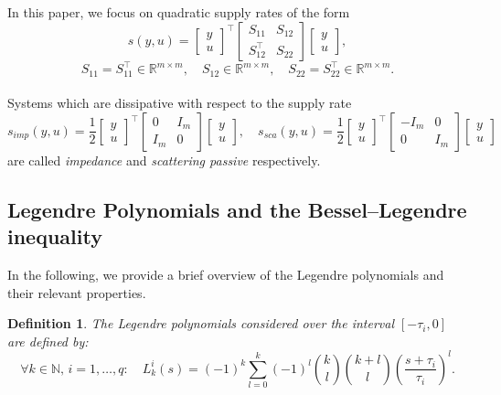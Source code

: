 \documentclass[12pt]{article}
\newtheorem{definition}{Definition}
\begin{document}
In this paper, we focus on quadratic supply rates of the form 
\[s(y,u) =\label{eq:supply_rate}
\begin{bmatrix} y\\ u \end{bmatrix}^\top
\begin{bmatrix} S_{11} & S_{12} \\ S_{12}^\top & S_{22} \end{bmatrix}
\begin{bmatrix} y\\ u \end{bmatrix},\]
\[S_{11}=S_{11}^\top\in\mathbb{R}^{m \times m}, \quad S_{12}\in\mathbb{R}^{m\times m},\quad S_{22}=S_{22}^\top \in \mathbb{R}^{m \times m}.
\]
\vspace{1mm}
\\
Systems which are dissipative with respect to the supply rate 
\[
s_{imp}(y,u)=\frac12\begin{bmatrix}
    y\\ u
\end{bmatrix}^\top\begin{bmatrix}
    0&I_m\\ I_m&0
\end{bmatrix}\begin{bmatrix}
    y\\ u
\end{bmatrix},\quad s_{sca}(y,u)=\frac12\begin{bmatrix}
    y\\ u
\end{bmatrix}^\top\begin{bmatrix}
    -I_m &0\\ 0&I_m
\end{bmatrix}\begin{bmatrix}
    y\\ u
\end{bmatrix}
\]
are called \emph{impedance} and \emph{scattering passive} respectively.
\vspace{1mm}\\
\subsection{Legendre Polynomials and the Bessel--Legendre inequality}
In the following, we provide a brief overview of the Legendre polynomials and their relevant properties.
\begin{definition}
The Legendre polynomials considered over the interval $[-\tau_i, 0]$ are defined by: 
\begin{equation}
    \forall k \in \mathbb{N},\,i=1,\ldots,q: \quad L_k^i(s) = (-1)^k \sum_{l=0}^k (-1)^l \binom{k}{l} \binom{k+l}{l} \left( \frac{s+\tau_i}{\tau_i} \right)^l.
\end{equation}
\end{definition}
\end{document}
